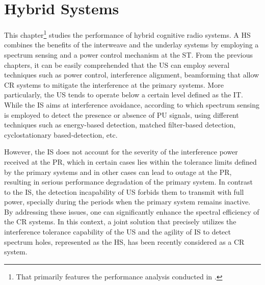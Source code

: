 \chapter{Hybrid Systems} \label{chap:HS}
This chapter\footnote{That primarily features the performance analysis conducted in .} studies the performance of hybrid cognitive radio systems. A HS combines the benefits of the interweave and the underlay systems by employing a spectrum sensing and a power control mechanism at the ST. 
From the previous chapters, it can be easily comprehended that the US can employ several techniques such as power control, interference alignment, beamforming that allow CR systems to mitigate the interference at the primary systems. More particularly, the US tends to operate below a certain level defined as the IT. 
While the IS aims at interference avoidance, according to which spectrum sensing is employed to detect the presence or absence of PU signals, using different techniques such as energy-based detection, matched filter-based detection, cyclostationary based-detection, etc. %

However, the IS does not account for the severity of the interference power received at the PR, which in certain cases lies within the tolerance limits defined by the primary systems and in other cases can lead to outage at the PR, resulting in serious performance degradation of the primary system. In contrast to the IS, the detection incapability of US forbids them to transmit with full power, specially during the periods when the primary system remains inactive. By addressing these issues, one can significantly enhance the spectral efficiency of the CR systems. In this context, a joint solution that precisely utilizes the interference tolerance capability of the US and the agility of IS to detect spectrum holes, represented as the HS, has been recently considered as a CR system. 



